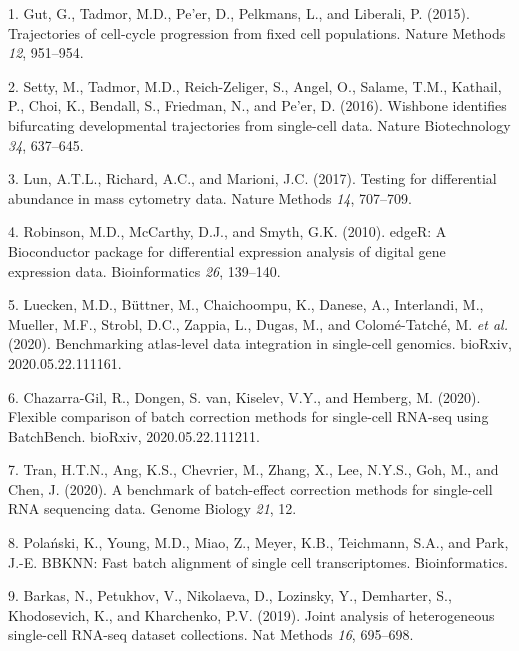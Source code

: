 \documentclass[
]{article}
\newenvironment{cslreferences}%
  {}%
  {\par}
\begin{document}
\hypertarget{refs}{}
\begin{cslreferences}
\leavevmode\hypertarget{ref-gutTrajectoriesCellcycleProgression2015}{}%
1. Gut, G., Tadmor, M.D., Pe'er, D., Pelkmans, L., and Liberali, P. (2015). Trajectories of cell-cycle progression from fixed cell populations. Nature Methods \emph{12}, 951--954.

\leavevmode\hypertarget{ref-settyWishboneIdentifiesBifurcating2016}{}%
2. Setty, M., Tadmor, M.D., Reich-Zeliger, S., Angel, O., Salame, T.M., Kathail, P., Choi, K., Bendall, S., Friedman, N., and Pe'er, D. (2016). Wishbone identifies bifurcating developmental trajectories from single-cell data. Nature Biotechnology \emph{34}, 637--645.

\leavevmode\hypertarget{ref-lunTestingDifferentialAbundance2017}{}%
3. Lun, A.T.L., Richard, A.C., and Marioni, J.C. (2017). Testing for differential abundance in mass cytometry data. Nature Methods \emph{14}, 707--709.

\leavevmode\hypertarget{ref-robinsonEdgeRBioconductorPackage2010a}{}%
4. Robinson, M.D., McCarthy, D.J., and Smyth, G.K. (2010). edgeR: A Bioconductor package for differential expression analysis of digital gene expression data. Bioinformatics \emph{26}, 139--140.

\leavevmode\hypertarget{ref-lueckenBenchmarkingAtlaslevelData2020}{}%
5. Luecken, M.D., Büttner, M., Chaichoompu, K., Danese, A., Interlandi, M., Mueller, M.F., Strobl, D.C., Zappia, L., Dugas, M., and Colomé-Tatché, M. \emph{et al.} (2020). Benchmarking atlas-level data integration in single-cell genomics. bioRxiv, 2020.05.22.111161.

\leavevmode\hypertarget{ref-chazarra-gilFlexibleComparisonBatch2020}{}%
6. Chazarra-Gil, R., Dongen, S. van, Kiselev, V.Y., and Hemberg, M. (2020). Flexible comparison of batch correction methods for single-cell RNA-seq using BatchBench. bioRxiv, 2020.05.22.111211.

\leavevmode\hypertarget{ref-tranBenchmarkBatcheffectCorrection2020}{}%
7. Tran, H.T.N., Ang, K.S., Chevrier, M., Zhang, X., Lee, N.Y.S., Goh, M., and Chen, J. (2020). A benchmark of batch-effect correction methods for single-cell RNA sequencing data. Genome Biology \emph{21}, 12.

\leavevmode\hypertarget{ref-polanskiBBKNNFastBatch}{}%
8. Polański, K., Young, M.D., Miao, Z., Meyer, K.B., Teichmann, S.A., and Park, J.-E. BBKNN: Fast batch alignment of single cell transcriptomes. Bioinformatics.

\leavevmode\hypertarget{ref-barkasJointAnalysisHeterogeneous2019}{}%
9. Barkas, N., Petukhov, V., Nikolaeva, D., Lozinsky, Y., Demharter, S., Khodosevich, K., and Kharchenko, P.V. (2019). Joint analysis of heterogeneous single-cell RNA-seq dataset collections. Nat Methods \emph{16}, 695--698.


\end{cslreferences}
\end{document}
